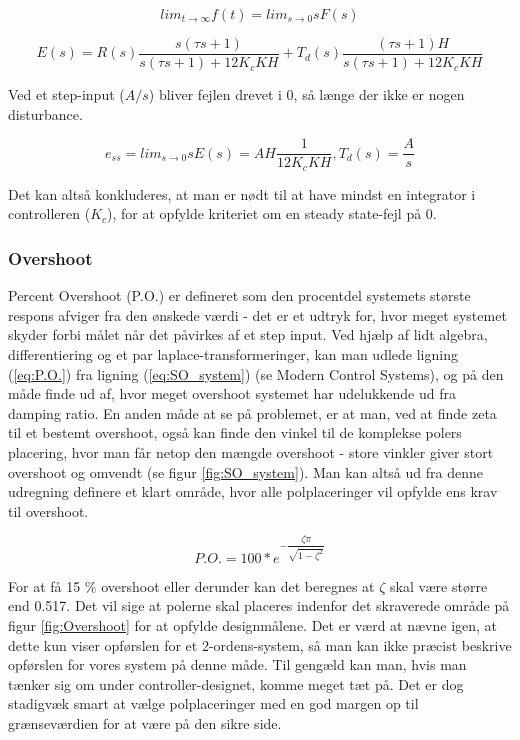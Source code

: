 \begin{equation} \label{eq:FVT}
lim_{t \to \infty} f(t) = lim_{s \to 0} sF(s)
\end{equation}

\begin{equation} \label{eq:ess}
E(s)=R(s)\frac{s(\tau s+1)}{s(\tau s+1)+12K_{c}KH}+T_{d}(s)\frac{(\tau s+1)H}{s(\tau s+1)+12K_{c}KH}
\end{equation}

Ved et step-input ($A/s$) bliver fejlen drevet i 0, så længe der ikke er nogen disturbance. 

\begin{equation}
e_{ss}=lim_{s \to 0} sE(s)=AH\frac{1}{12K_{c}KH} , T_{d}(s)=\dfrac{A}{s}
\end{equation}

Det kan altså konkluderes, at man er nødt til at have mindst en integrator i controlleren ($K_{c}$), for at opfylde kriteriet om en steady state-fejl på 0. 

\subsubsection{Overshoot}

Percent Overshoot (P.O.) er defineret som den procentdel systemets største respons afviger fra den ønskede værdi - det er et udtryk for, hvor meget systemet skyder forbi målet når det påvirkes af et step input. Ved hjælp af lidt algebra, differentiering og et par laplace-transformeringer, kan man udlede ligning (\ref{eq:P.O.}) fra ligning (\ref{eq:SO_system}) (se Modern Control Systems\cite{ModernControlSystem}), og på den måde finde ud af, hvor meget overshoot systemet har udelukkende ud fra damping ratio. En anden måde at se på problemet, er at man, ved at finde zeta til et bestemt overshoot, også kan finde den vinkel til de komplekse polers placering, hvor man får netop den mængde overshoot - store vinkler giver stort overshoot og omvendt (se figur \ref{fig:SO_system}). Man kan altså ud fra denne udregning definere et klart område, hvor alle polplaceringer vil opfylde ens krav til overshoot. 

\begin{equation}\label{eq:P.O.}
P.O.=100*e^{-\dfrac{\zeta\pi}{\sqrt{1-\zeta^2}}}
\end{equation}

For at få 15 $\%$ overshoot eller derunder kan det beregnes at $\zeta$ skal være større end 0.517. Det vil sige at polerne skal placeres indenfor det skraverede område på figur \ref{fig:Overshoot} for at opfylde designmålene. Det er værd at nævne igen, at dette kun viser opførslen for et 2-ordens-system, så man kan ikke præcist beskrive opførslen for vores system på denne måde. Til gengæld kan man, hvis man tænker sig om under controller-designet, komme meget tæt på. Det er dog stadigvæk smart at vælge polplaceringer med en god margen op til grænseværdien for at være på den sikre side.

